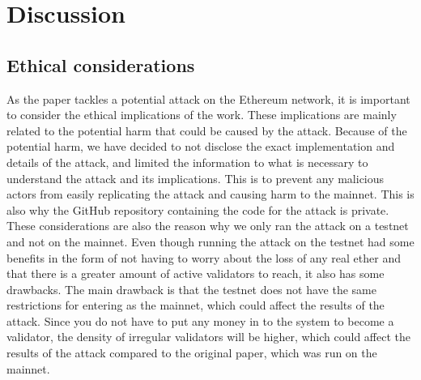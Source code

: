 

\section{Discussion}\label{sec:discussion}

\subsection{Ethical considerations}\label{subsec:ethical-considerations}
As the paper tackles a potential attack on the Ethereum network, it is important to consider the ethical implications of the work.
These implications are mainly related to the potential harm that could be caused by the attack.
Because of the potential harm, we have decided to not disclose the exact implementation and details of the attack, and limited the information to what is necessary to understand the attack and its implications.
This is to prevent any malicious actors from easily replicating the attack and causing harm to the mainnet.
This is also why the GitHub repository containing the code for the attack is private.
These considerations are also the reason why we only ran the attack on a testnet and not on the mainnet.
Even though running the attack on the testnet had some benefits in the form of not having to worry about the loss of any real ether and that there is a greater amount of active validators to reach, it also has some drawbacks.
The main drawback is that the testnet does not have the same restrictions for entering as the mainnet, which could affect the results of the attack.
Since you do not have to put any money in to the system to become a validator, the density of irregular validators will be higher, which could affect the results of the attack compared to the original paper, which was run on the mainnet.

